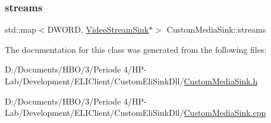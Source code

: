 \subsubsection{\texorpdfstring{streams}{streams}}
{\footnotesize\ttfamily std\+::map$<$D\+W\+O\+RD, \hyperlink{class_video_stream_sink}{Video\+Stream\+Sink}$\ast$$>$ Custom\+Media\+Sink\+::streams\hspace{0.3cm}{\ttfamily [private]}}



The documentation for this class was generated from the following files\+:\begin{DoxyCompactItemize}
\item 
D\+:/\+Documents/\+H\+B\+O/3/\+Periode 4/\+H\+P-\/\+Lab/\+Development/\+E\+L\+I\+Client/\+Custom\+Eli\+Sink\+Dll/\hyperlink{_custom_media_sink_8h}{Custom\+Media\+Sink.\+h}\item 
D\+:/\+Documents/\+H\+B\+O/3/\+Periode 4/\+H\+P-\/\+Lab/\+Development/\+E\+L\+I\+Client/\+Custom\+Eli\+Sink\+Dll/\hyperlink{_custom_media_sink_8cpp}{Custom\+Media\+Sink.\+cpp}\end{DoxyCompactItemize}
